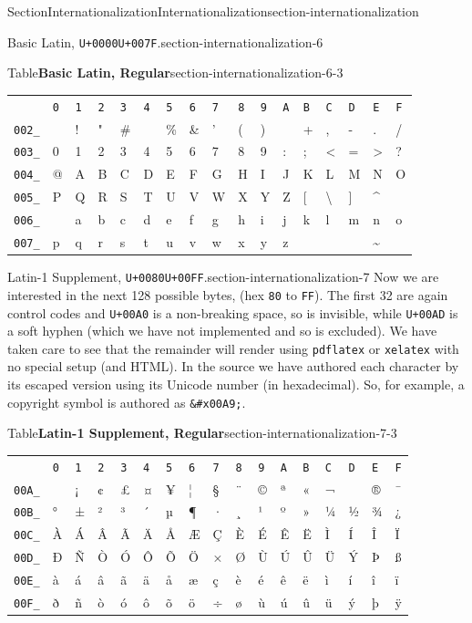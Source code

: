 \documentclass[twoside,10pt,]{article}
\newcommand{\tabularfont}{\relax}
\newcommand{\mono}[1]{\texttt{#1}}
\numberwithin{equation}{section}
\begin{document}
\begin{sectionptx}{Section}{Internationalization}{}{Internationalization}{}{}{section-internationalization}
\begin{paragraphs}{Basic Latin, \mono{U+0000}\textendash{}\mono{U+007F}.}{section-internationalization-6}
\begin{tableptx}{Table}{\textbf{Basic Latin, Regular}}{section-internationalization-6-3}{}
\centering%
{\tabularfont%
\begin{tabular}{lllllllllllllllll}
&\mono{0}&\mono{1}&\mono{2}&\mono{3}&\mono{4}&\mono{5}&\mono{6}&\mono{7}&\mono{8}&\mono{9}&\mono{A}&\mono{B}&\mono{C}&\mono{D}&\mono{E}&\mono{F}\tabularnewline[0pt]
\mono{002\_}&&!&"&\#&\textdollar{}&\%&\&&'&(&)&\textasteriskcentered{}&+&,&-&.&\slash{}\tabularnewline[0pt]
\mono{003\_}&0&1&2&3&4&5&6&7&8&9&:&;&\textless{}&=&\textgreater{}&?\tabularnewline[0pt]
\mono{004\_}&@&A&B&C&D&E&F&G&H&I&J&K&L&M&N&O\tabularnewline[0pt]
\mono{005\_}&P&Q&R&S&T&U&V&W&X&Y&Z&[&\textbackslash{}&]&\textasciicircum{}&\textunderscore{}\tabularnewline[0pt]
\mono{006\_}&\textasciigrave{}&a&b&c&d&e&f&g&h&i&j&k&l&m&n&o\tabularnewline[0pt]
\mono{007\_}&p&q&r&s&t&u&v&w&x&y&z&\textbraceleft{}&\textbar{}&\textbraceright{}&\textasciitilde{}&
\end{tabular}
}%
\end{tableptx}%
\end{paragraphs}%
\begin{paragraphs}{Latin-1 Supplement, \mono{U+0080}\textendash{}\mono{U+00FF}.}{section-internationalization-7}%
Now we are interested in the next 128 possible bytes,  (hex \mono{80} to \mono{FF}).  The first 32 are again control codes and \mono{U+00A0} is a non-breaking space, so is invisible, while \mono{U+00AD} is a soft hyphen (which we have not implemented and so is excluded).  We have taken care to see that the remainder will render using \mono{pdflatex} or \mono{xelatex} with no special setup (and HTML).  In the source we have authored each character by its escaped version using its Unicode number (in hexadecimal).  So, for example, a copyright symbol is authored as \mono{\&\#x00A9;}.%
\begin{tableptx}{Table}{\textbf{Latin-1 Supplement, Regular}}{section-internationalization-7-3}{}%
\centering%
{\tabularfont%
\begin{tabular}{lllllllllllllllll}
&\mono{0}&\mono{1}&\mono{2}&\mono{3}&\mono{4}&\mono{5}&\mono{6}&\mono{7}&\mono{8}&\mono{9}&\mono{A}&\mono{B}&\mono{C}&\mono{D}&\mono{E}&\mono{F}\tabularnewline[0pt]
\mono{00A\_}& &¡&¢&£&¤&¥&¦&§&¨&©&ª&«&¬&&®&¯\tabularnewline[0pt]
\mono{00B\_}&°&±&²&³&´&µ&¶&·&¸&¹&º&»&¼&½&¾&¿\tabularnewline[0pt]
\mono{00C\_}&À&Á&Â&Ã&Ä&Å&Æ&Ç&È&É&Ê&Ë&Ì&Í&Î&Ï\tabularnewline[0pt]
\mono{00D\_}&Ð&Ñ&Ò&Ó&Ô&Õ&Ö&×&Ø&Ù&Ú&Û&Ü&Ý&Þ&ß\tabularnewline[0pt]
\mono{00E\_}&à&á&â&ã&ä&å&æ&ç&è&é&ê&ë&ì&í&î&ï\tabularnewline[0pt]
\mono{00F\_}&ð&ñ&ò&ó&ô&õ&ö&÷&ø&ù&ú&û&ü&ý&þ&ÿ
\end{tabular}
}%
\end{tableptx}%

\end{paragraphs}
\end{sectionptx}
\end{document}
